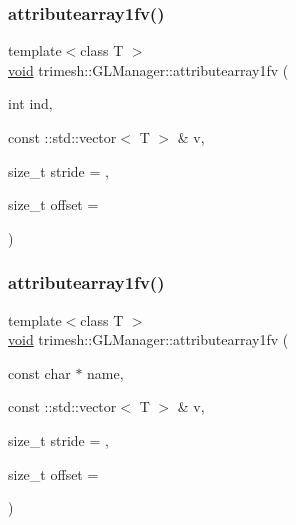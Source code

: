 \subsubsection{\texorpdfstring{attributearray1fv()}{attributearray1fv()}\hspace{0.1cm}{\footnotesize\ttfamily [3/6]}}
{\footnotesize\ttfamily template$<$class T $>$ \\
\hyperlink{namespacetrimesh_a784ddfd979e1c579bda795a8edfc3f43}{void} trimesh\+::\+G\+L\+Manager\+::attributearray1fv (\begin{DoxyParamCaption}\item[{int}]{ind,  }\item[{const \+::std\+::vector$<$ T $>$ \&}]{v,  }\item[{size\+\_\+t}]{stride = {},  }\item[{size\+\_\+t}]{offset = {} }\end{DoxyParamCaption})\hspace{0.3cm}{\ttfamily [inline]}}

\mbox{\label{classtrimesh_1_1GLManager_a656197ed8aacc4c7f903b97e4f7fb648}} 
\subsubsection{\texorpdfstring{attributearray1fv()}{attributearray1fv()}\hspace{0.1cm}{\footnotesize\ttfamily [4/6]}}
{\footnotesize\ttfamily template$<$class T $>$ \\
\hyperlink{namespacetrimesh_a784ddfd979e1c579bda795a8edfc3f43}{void} trimesh\+::\+G\+L\+Manager\+::attributearray1fv (\begin{DoxyParamCaption}\item[{const char $\ast$}]{name,  }\item[{const \+::std\+::vector$<$ T $>$ \&}]{v,  }\item[{size\+\_\+t}]{stride = {},  }\item[{size\+\_\+t}]{offset = {} }\end{DoxyParamCaption})\hspace{0.3cm}{\ttfamily [inline]}}

\mbox{\label{classtrimesh_1_1GLManager_a533f0293175df65f99d72a3643f4cb35}} 
